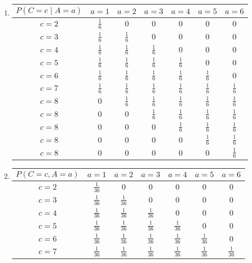 \begin{enumerate}[label=\alph*.]
\item
\begin{tabular}{c|cccccc}
$P(C=c \mid A=a)$ & $a=1$ & $a=2$ & $a=3$ & $a=4$ & $a=5$ & $a=6$ \\
\hline
$c = 2$ & $\frac{1}{6}$ & $0$ & $0$ & $0$ & $0$ & $0$ \\
$c = 3$ & $\frac{1}{6}$ & $\frac{1}{6}$ & $0$ & $0$ & $0$ & $0$ \\
$c = 4$ & $\frac{1}{6}$ & $\frac{1}{6}$ & $\frac{1}{6}$ & $0$ & $0$ & $0$ \\
$c = 5$ & $\frac{1}{6}$ & $\frac{1}{6}$ & $\frac{1}{6}$ & $\frac{1}{6}$ & $0$ & $0$ \\
$c = 6$ & $\frac{1}{6}$ & $\frac{1}{6}$ & $\frac{1}{6}$ & $\frac{1}{6}$ & $\frac{1}{6}$ & $0$ \\
$c = 7$ & $\frac{1}{6}$ & $\frac{1}{6}$ & $\frac{1}{6}$ & $\frac{1}{6}$ & $\frac{1}{6}$ & $\frac{1}{6}$ \\
$c = 8$ & $0$ & $\frac{1}{6}$ & $\frac{1}{6}$ & $\frac{1}{6}$ & $\frac{1}{6}$ & $\frac{1}{6}$ \\
$c = 8$ & $0$ & $0$ & $\frac{1}{6}$ & $\frac{1}{6}$ & $\frac{1}{6}$ & $\frac{1}{6}$ \\
$c = 8$ & $0$ & $0$ & $0$ & $\frac{1}{6}$ & $\frac{1}{6}$ & $\frac{1}{6}$ \\
$c = 8$ & $0$ & $0$ & $0$ & $0$ & $\frac{1}{6}$ & $\frac{1}{6}$ \\
$c = 8$ & $0$ & $0$ & $0$ & $0$ & $0$ & $\frac{1}{6}$ \\
\end{tabular}
\item
\begin{tabular}{c|cccccc}
$P(C=c, A=a)$ & $a=1$ & $a=2$ & $a=3$ & $a=4$ & $a=5$ & $a=6$ \\
\hline
$c = 2$  & $\frac{1}{36}$ & $0$ & $0$ & $0$ & $0$ & $0$ \\
$c = 3$  & $\frac{1}{36}$ & $\frac{1}{36}$ & $0$ & $0$ & $0$ & $0$ \\
$c = 4$  & $\frac{1}{36}$ & $\frac{1}{36}$ & $\frac{1}{36}$ & $0$ & $0$ & $0$ \\
$c = 5$  & $\frac{1}{36}$ & $\frac{1}{36}$ & $\frac{1}{36}$ & $\frac{1}{36}$ & $0$ & $0$ \\
$c = 6$  & $\frac{1}{36}$ & $\frac{1}{36}$ & $\frac{1}{36}$ & $\frac{1}{36}$ & $\frac{1}{36}$ & $0$ \\
$c = 7$  & $\frac{1}{36}$ & $\frac{1}{36}$ & $\frac{1}{36}$ & $\frac{1}{36}$ & $\frac{1}{36}$ & $\frac{1}{36}$ \\

\end{tabular}
\end{enumerate}
